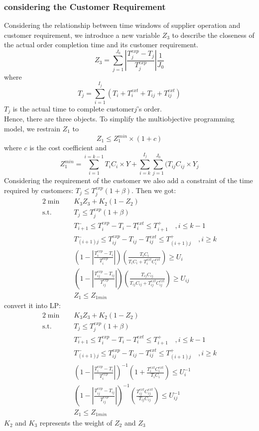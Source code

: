 \documentclass[12pt,a4paper]{article}
\begin{document}
\subsubsection{considering  the Customer Requirement}
Considering the relationship between time windows of supplier operation and customer requirement, we introduce a new variable $Z_3$ to describe the closeness of the actual order completion time and its customer requirement.
\begin{equation}
	Z_3=\sum_{j=1}^{J_0}|\frac{T_j^{exp}-T_j}{T_j^{exp}}|\frac{1}{J_0}
\end{equation} 
where
\begin{equation}
	T_j=\sum_{i=1}^{I_j}(T_i+T_i^{ext}+T_{ij}+T_{ij}^{ext})
\end{equation}
$T_j$ is the actual time to complete customer$j$'s order.\\
Hence, there are three objects. To simplify the multiobjective programming model, we restrain $Z_1$ to 
\begin{equation}
 Z_1\leq Z_1^{min}\times(1+c)
\end{equation} 
where $c$ is the cost coefficient and 
\begin{equation}
Z_1^{min}= \sum_{i=1}^{i=k-1}T_iC_i\times Y+\sum_{i=k}^{I_j}\sum_{j=1}^{J_0}(T_{ij}C_{ij}\times Y_j
\end{equation}
Considering the requirement of the customer we also add a constraint of the time required by customers: $T_j\leq T_j^{exp}(1+\beta)$. Then we got:
\begin{alignat}{2}
\min \quad & K_3Z_3+K_2(1-Z_2)\\
\mbox{s.t.}\quad
& T_j\leq T_j^{exp}(1+\beta)\\
& T_{i+1}^-\leq T_i^{exp}-T_i-T_i^{ext}\leq T_{i+1}^+ \quad ,i\leq k-1\\
& T_{(i+1)j}^-\leq T_{ij}^{exp}-T_{ij}-T_{ij}^{ext}\leq T_{(i+1)j}^+ \quad, i\geq k\\
& (1-|\frac{T_i^{exp}-T_i}{T_i^{exp}}|)(\frac{T_iC_i}{T_iC_i+T_i^{ext}C_i^{ext}})\geq U_i\\
& (1-|\frac{T_{ij}^{exp}-T_{ij}}{T_{ij}^{exp}}|)(\frac{T_{ij}C_{ij}}{T_{ij}C_{ij}+T_{ij}^{ext}C_{ij}^{ext}})\geq U_{ij}\\
& Z_1\leq Z_{1min}
\end{alignat}
convert it into LP:
\begin{alignat}{2}
\min \quad & K_3Z_3+K_2(1-Z_2)\\
\mbox{s.t.}\quad
& T_j\leq T_j^{exp}(1+\beta)\\
& T_{i+1}^-\leq T_i^{exp}-T_i-T_i^{ext}\leq T_{i+1}^+ \quad ,i\leq k-1\\
& T_{(i+1)j}^-\leq T_{ij}^{exp}-T_{ij}-T_{ij}^{ext}\leq T_{(i+1)j}^+ \quad, i\geq k\\
& (1-|\frac{T_i^{exp}-T_i}{T_i^{exp}}|)^{-1}(1+\frac{T_i^{ext}C_i^{ext}}{T_iC_i})\leq U_i^{-1}\\
& (1-|\frac{T_{ij}^{exp}-T_{ij}}{T_{ij}^{exp}}|)^{-1}(\frac{T_{ij}^{ext}C_{ij}^{ext}}{T_{ij}C_{ij}})\leq U_{ij}^{-1}\\
& Z_1\leq Z_{1min}
\end{alignat}
$K_2$ and $K_3$ represents the weight of $Z_2$ and $Z_3$
\end{document}
